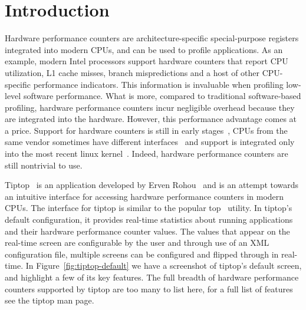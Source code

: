 \section{Introduction}
Hardware performance counters are architecture-specific special-purpose registers integrated into modern CPUs, and can be used to profile applications.
As an example, modern Intel processors support hardware counters that report CPU utilization, L1 cache misses, branch mispredictions and a host of other CPU-specific performance indicators.
This information is invaluable when profiling low-level software performance.
What is more, compared to traditional software-based profiling, hardware performance counters incur negligible overhead because they are integrated into the hardware.
However, this performance advantage comes at a price.
Support for hardware counters is still in early stages~\cite{xxx}, CPUs from the same vendor sometimes have different interfaces~\cite{xxx} and support is integrated only into the most recent linux kernel~\cite{xxx}.
Indeed, hardware performance counters are still nontrivial to use.

Tiptop~\cite{xxx} is an application developed by Erven Rohou~\cite{xxx} and is an attempt towards an intuitive interface for accessing hardware performance counters in modern CPUs.
The interface for tiptop is similar to the popular top~\cite{xxx} utility. 
In tiptop's default configuration, it provides real-time statistics about running applications and their hardware performance counter values.
The values that appear on the real-time screen are configurable by the user and through use of an XML configuration file, multiple screens can be configured and flipped through in real-time.
In Figure~\ref{fig:tiptop-default} we have a screenshot of tiptop's default screen, and highlight a few of its key features.
The full breadth of hardware performance counters supported by tiptop are too many to list here, for a full list of features see the tiptop man page.

